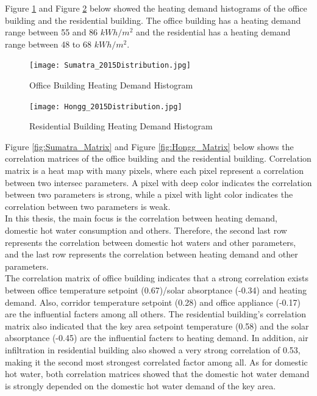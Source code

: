 		Figure \ref{fig:Sumatra_StationHistogram} and Figure \ref{fig:Hongg_StationHistogram} below showed the heating demand histograms of the office building and the residential building. The office building has a heating demand range between 55 and 86 $kWh/m^2$ and the residential has a heating demand range between 48 to 68 $kWh/m^2$.\\

	    \begin{figure}[H]
		\centering
		\texttt{[image: Sumatra\_2015Distribution.jpg]}
		\caption{Office Building Heating Demand Histogram}
		\label{fig:Sumatra_StationHistogram}
		\end{figure}	

	    \begin{figure}[H]
		\centering
		\texttt{[image: Hongg\_2015Distribution.jpg]}
		\caption{Residential Building Heating Demand Histogram}
		\label{fig:Hongg_StationHistogram}
		\end{figure}

		Figure \ref{fig:Sumatra_Matrix} and Figure \ref{fig:Hongg_Matrix} below shows the correlation matrices of the office building and the residential building. Correlation matrix is a heat map with many pixels, where each pixel represent a correlation between two intersec parameters. A pixel with deep color indicates the correlation between two parameters is strong, while a pixel with light color indicates the correlation between two parameters is weak.\\
		
		In this thesis, the main focus is the correlation between heating demand, domestic hot water consumption and others. Therefore, the second last row represents the correlation between domestic hot waters and other parameters, and the last row represents the correlation between heating demand and other parameters.\\
		
		The correlation matrix of office building indicates that a strong correlation exists between office temperature setpoint (0.67)/solar absorptance (-0.34) and heating demand. Also, corridor temperature setpoint (0.28) and office appliance (-0.17) are the influential facters among all others. The residential building's correlation matrix also indicated that the key area setpoint temperature (0.58) and the solar absorptance (-0.45) are the influential facters to heating demand. In addition, air infiltration in residential building also showed a very strong correlation of 0.53, making it the second most strongest correlated factor among all. As for domestic hot water, both correlation matrices showed that the domestic hot water demand is strongly depended on the domestic hot water demand of the key area.

